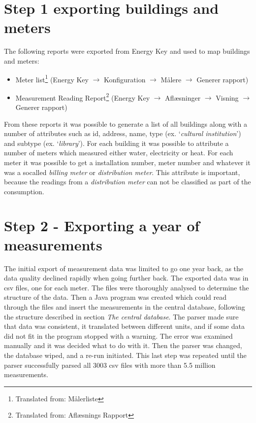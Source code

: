 \section*{Step 1 exporting buildings and meters}
The following reports were exported from Energy Key and used to map buildings and meters:
\begin{itemize}
\item Meter list\footnote{Translated from: Målerliste}  (Energy Key $\rightarrow$ Konfiguration $\rightarrow$ Målere $\rightarrow$ Generer rapport)
\item Measurement Reading Report\footnote{Translated from: Aflæsnings Rapport} (Energy Key $\rightarrow$ Aflæsninger $\rightarrow$ Visning $\rightarrow$ Generer rapport)
\end{itemize}
From these reports it was possible to generate a list of all buildings along with a number of attributes such as id, address, name, type (ex. ‘\emph{cultural institution}’) and subtype (ex. ‘\emph{library}’). For each building it was possible to attribute a number of meters which measured either water, electricity or heat. For each meter it was possible to get a installation number, meter number and whatever it was a socalled \emph{billing meter} or \emph{distribution meter}. This attribute is important, because the readings from a \emph{distribution meter} can not be classified as part of the consumption.
\section*{Step 2 - Exporting a year of measurements}
The initial export of measurement data was limited to go one year back, as the data quality declined rapidly when going further back. The exported data was in csv files, one for each meter. The files were thoroughly analysed to determine the structure of the data. Then a Java program was created which could read through the files and insert the measurements in the central database, following the structure described in section \emph{The central database}. The parser made sure that data was consistent, it translated between different units, and if some data did not fit in the program stopped with a warning. The error was examined manually and it was decided what to do with it. Then the parser was changed, the database wiped, and a re-run initiated. This last step was repeated until the parser successfully parsed all 3003 csv files with more than 5.5 million measurements. 
